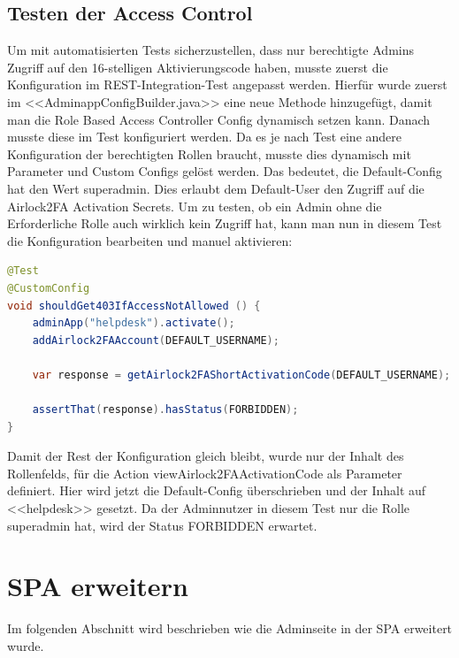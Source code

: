 \subsection{Testen der Access Control}\label{subsec:testacc}
Um mit automatisierten Tests sicherzustellen, dass nur berechtigte Admins Zugriff auf den 16-stelligen Aktivierungscode haben, musste zuerst die Konfiguration im REST-Integration-Test angepasst werden. Hierfür wurde zuerst im <<AdminappConfigBuilder.java>> eine neue Methode hinzugefügt, damit man die Role Based Access Controller Config dynamisch setzen kann. Danach musste diese im Test konfiguriert werden. Da es je nach Test eine andere Konfiguration der berechtigten Rollen braucht, musste dies dynamisch mit Parameter und Custom Configs gelöst werden. Das bedeutet, die Default-Config hat den Wert \flqq superadmin\frqq{}. Dies erlaubt dem Default-User den Zugriff auf die Airlock2FA Activation Secrets. Um zu testen, ob ein Admin ohne die Erforderliche Rolle auch wirklich kein Zugriff hat, kann man nun in diesem Test die Konfiguration bearbeiten und manuel aktivieren:
\begin{lstlisting}[language=Java]
@Test
@CustomConfig
void shouldGet403IfAccessNotAllowed () {
	adminApp("helpdesk").activate();
	addAirlock2FAAccount(DEFAULT_USERNAME);
	
	var response = getAirlock2FAShortActivationCode(DEFAULT_USERNAME);
	
	assertThat(response).hasStatus(FORBIDDEN);
}
\end{lstlisting}
Damit der Rest der Konfiguration gleich bleibt, wurde nur der Inhalt des Rollenfelds, für die Action \flqq viewAirlock2FAActivationCode\frqq{} als Parameter definiert. Hier wird jetzt die Default-Config überschrieben und der Inhalt auf <<helpdesk>> gesetzt. Da der Adminnutzer in diesem Test nur die Rolle superadmin hat, wird der Status FORBIDDEN erwartet.
\section{SPA erweitern}
Im folgenden Abschnitt wird beschrieben wie die Adminseite in der SPA erweitert wurde.

